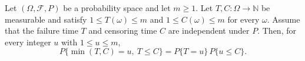 \begin{theorem}
Let $(\Omega,\mathcal F,P)$ be a probability space and let $m\ge1$.
Let $T,C:\Omega\to\mathbb N$ be measurable and satisfy
$1\le T(\omega)\le m$ and $1\le C(\omega)\le m$ for every $\omega$.
Assume that the failure time $T$ and censoring time $C$ are independent
under $P$.  Then, for every integer $u$ with $1\le u\le m$,
\[
 P\{\min(T,C)=u,\ T\le C\}
 =P\{T=u\}\,P\{u\le C\}.
\]
\end{theorem}
